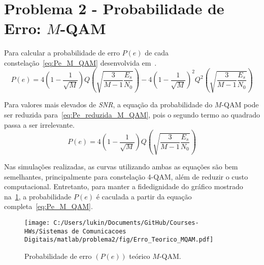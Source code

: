 \section{Problema 2 - Probabilidade de Erro: \texorpdfstring{$M$}{M}-QAM}
Para calcular a probabilidade de erro $P(e)$ de cada constelação~\ref{eq:Pe_M_QAM} desenvolvida em~\cite{Cecilio}.
\begin{equation}
    P(e) = 4 \left(1-\frac{1}{\sqrt{M}}\right) Q\left(\sqrt{\frac{3}{M-1}\frac{E_s}{N_0}}\right) - 4\left(1-\frac{1}{\sqrt{M}}\right)^2 Q^2\left(\sqrt{\frac{3}{M-1}\frac{E_s}{N_0}}\right)
    \label{eq:Pe_M_QAM}
\end{equation}

Para valores mais elevados de \textit{SNR}, a equação da probabilidade do $M$-QAM pode ser reduzida para~\ref{eq:Pe_reduzida_M_QAM}, pois o segundo termo ao quadrado passa a ser irrelevante.
\begin{equation}
    P(e) = 4 \left(1-\frac{1}{\sqrt{M}}\right) Q\left(\sqrt{\frac{3}{M-1}\frac{E_s}{N_0}}\right)
    \label{eq:Pe_reduzida_M_QAM}
\end{equation}

Nas simulações realizadas, as curvas utilizando ambas as equações são bem semelhantes, principalmente para constelação 4-QAM, além de reduzir o custo computacional. Entretanto, para manter a fidedignidade do gráfico mostrado na~\ref{fig:Erro_Teorico_MQAM}, a probabilidade $P(e)$ é caculada a partir da equação completa~\ref{eq:Pe_M_QAM}.

\begin{figure}[!ht]
    \centering
    \texttt{[image: C:/Users/lukin/Documents/GitHub/Courses-HWs/Sistemas de Comunicacoes Digitais/matlab/problema2/fig/Erro\_Teorico\_MQAM.pdf]}
    \caption{Probabilidade de erro $(P(e))$ teórico $M$-QAM.}
    \label{fig:Erro_Teorico_MQAM}
\end{figure}